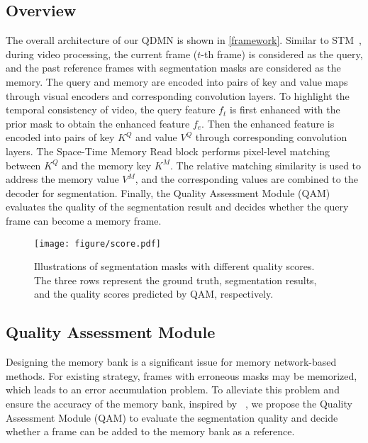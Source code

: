 \documentclass[runningheads]{llncs}
\begin{document}
%
 
\subsection{Overview}\label{overview}
    The overall architecture of our QDMN is shown in \cref{framework}. 
    Similar to STM~\cite{stm}, during video processing, the current frame ($t$-th frame) is considered as the query, and the past reference frames with segmentation masks are considered as the memory.
    The query and memory are encoded into pairs of key and value maps through visual encoders and corresponding convolution layers.
To highlight the temporal consistency of video, the query feature $f_t$ is first enhanced with the prior mask to obtain the enhanced feature $f_e$. Then the enhanced feature is encoded into pairs of key ${K}^Q$ and value ${V}^Q$ through corresponding convolution layers.
    The Space-Time Memory Read block performs pixel-level matching between ${K}^Q$ and the memory key ${K}^M$.
    The relative matching similarity is used to address the memory value ${V}^M$, and the corresponding values are combined to the decoder for segmentation.
    Finally, the Quality Assessment Module (QAM) evaluates the quality of the segmentation result and decides whether the query frame can become a memory frame.
    \begin{figure*}[t]
      \centering
      \texttt{[image: figure/score.pdf]}
      \caption{Illustrations of segmentation masks with different quality scores. 
      The three rows represent the ground truth, segmentation results, and the quality scores predicted by QAM, respectively.}
      
      \label{figure score}
    \end{figure*}
   
     
\subsection{Quality Assessment Module}\label{QAM}
    Designing the memory bank is a significant issue for memory network-based methods. 
    For existing strategy, frames with erroneous masks may be memorized, which leads to an error accumulation problem.
    To alleviate this problem and ensure the accuracy of the memory bank, inspired by ~\cite{msrcnn,iou-net}, we propose the Quality Assessment Module (QAM) to evaluate the segmentation quality and decide whether a frame can be added to the memory bank as a reference.
    
\end{document}
